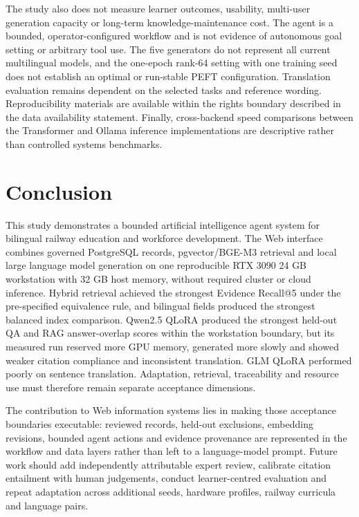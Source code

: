 The study also does not measure learner outcomes, usability, multi-user generation capacity or long-term knowledge-maintenance cost. The agent is a bounded, operator-configured workflow and is not evidence of autonomous goal setting or arbitrary tool use. The five generators do not represent all current multilingual models, and the one-epoch rank-64 setting with one training seed does not establish an optimal or run-stable PEFT configuration. Translation evaluation remains dependent on the selected tasks and reference wording. Reproducibility materials are available within the rights boundary described in the data availability statement. Finally, cross-backend speed comparisons between the Transformer and Ollama inference implementations are descriptive rather than controlled systems benchmarks.

\section{Conclusion}

This study demonstrates a bounded artificial intelligence agent system for bilingual railway education and workforce development. The Web interface combines governed PostgreSQL records, pgvector/BGE-M3 retrieval and local large language model generation on one reproducible RTX 3090 24 GB workstation with 32 GB host memory, without required cluster or cloud inference. Hybrid retrieval achieved the strongest Evidence Recall@5 under the pre-specified equivalence rule, and bilingual fields produced the strongest balanced index comparison. Qwen2.5 QLoRA produced the strongest held-out QA and RAG answer-overlap scores within the workstation boundary, but its measured run reserved more GPU memory, generated more slowly and showed weaker citation compliance and inconsistent translation. GLM QLoRA performed poorly on sentence translation. Adaptation, retrieval, traceability and resource use must therefore remain separate acceptance dimensions.

The contribution to Web information systems lies in making those acceptance boundaries executable: reviewed records, held-out exclusions, embedding revisions, bounded agent actions and evidence provenance are represented in the workflow and data layers rather than left to a language-model prompt. Future work should add independently attributable expert review, calibrate citation entailment with human judgements, conduct learner-centred evaluation and repeat adaptation across additional seeds, hardware profiles, railway curricula and language pairs.

